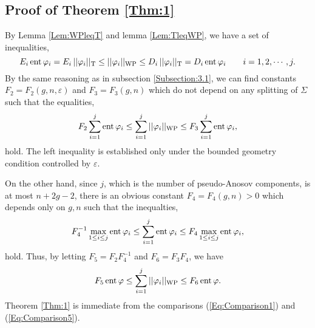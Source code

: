 \documentclass[11pt,reqno]{amsart}
\numberwithin{equation}{section}
\begin{document}
\subsection{Proof of Theorem \ref{Thm:1}} 

By Lemma \ref{Lem:WPleqT} and lemma \ref{Lem:TleqWP}, 
we have a set of inequalities, 
\begin{equation*}\label{Eq:Comparison2}
	E_i \, {\rm ent} \, \varphi_i 
	= E_i \, || \varphi_i ||_{{\rm T}} 
	\leq  || \varphi_i ||_{{\rm WP}} 
	\leq D_i \, || \varphi_i ||_{{\rm T}} 
	= D_i \, {\rm ent} \, \varphi_i 
	\qquad i = 1, 2, \cdots, j.     
\end{equation*}  
By the same reasoning as in subsection \ref{Subsection:3.1}, 
we can find constants  $F_2 = F_2(g, n, \varepsilon)$  
and  $F_3 = F_3(g, n)$  which do not depend on any splitting of  $\varSigma$  
such that the equalities,  
\begin{equation}\label{Eq:Comparison2}
	F_2 \sum_{i=1}^j {\rm ent} \, \varphi_i 
	\leq \sum_{i = 1}^j || \varphi_i ||_{{\rm WP}} 
	\leq F_3 \sum_{i=1}^j {\rm ent} \, \varphi_i,   
\end{equation}  
hold.  
The left inequality is established only under the bounded geometry 
condition controlled by  $\varepsilon$.  

On the other hand, 
since  $j$,  which is the number of pseudo-Anosov components,  
is at most  $n+ 2g-2$, 
there is an obvious constant  $F_4 = F_4(g, n) > 0$  which depends  only on  $g, n$  
such that the inequalties, 
\begin{equation*}\label{Eq:Comparison4}
	F_4^{-1} \max_{1 \leq i \leq j} {\rm ent} \, \varphi_i 
	\leq \sum_{i = 1}^j {\rm ent} \, \varphi_i 
	\leq 	F_4 \max_{1 \leq i \leq j} {\rm ent} \, \varphi_i,   
\end{equation*}  
hold.     
Thus, 
by letting  $F_5 = F_2 F_4^{-1}$  and  $F_6 = F_3 F_4$,  
we have 
\begin{equation}\label{Eq:Comparison5}
	F_5 \, {\rm ent} \, \varphi 
	\leq \sum_{i = 1}^j || \varphi_i ||_{{\rm WP}} 
	\leq F_6 \, {\rm ent} \, \varphi.     
\end{equation}  
Theorem \ref{Thm:1} is immediate from 
the comparisons (\ref{Eq:Comparison1})  
and  (\ref{Eq:Comparison5}).  
\end{document}
